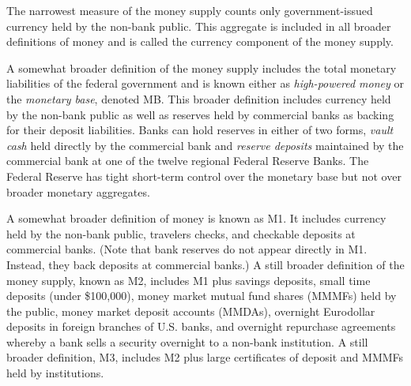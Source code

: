\documentclass[letterpaper,12pt]{article}
\begin{document}
The narrowest measure of the money supply counts only
government-issued currency held by the non-bank public. This
aggregate is included in all broader definitions of money and is
called the currency component of the money supply.

A somewhat broader definition of the money supply includes the total
monetary liabilities of the federal government and is known either
as \textit{high-powered money} or the \textit{monetary base},
denoted MB. This broader definition includes currency held by the
non-bank public as well as reserves held by commercial banks as
backing for their deposit liabilities. Banks can hold reserves in
either of two forms, \textit{vault cash} held directly by the
commercial bank and \textit{reserve deposits} maintained by the
commercial bank at one of the twelve regional Federal Reserve Banks.
The Federal Reserve has tight short-term control over the monetary
base but not over broader monetary aggregates.

A somewhat broader definition of money is known as M1. It includes
currency held by the non-bank public, travelers checks, and
checkable deposits at commercial banks. (Note that bank reserves do
not appear directly in M1. Instead, they back deposits at commercial
banks.) A still broader definition of the money supply, known as M2,
includes M1 plus savings deposits, small time deposits (under
\$100,000), money market mutual fund shares (MMMFs) held by the
public, money market deposit accounts (MMDAs), overnight Eurodollar
deposits in foreign branches of U.S. banks, and overnight repurchase
agreements whereby a bank sells a security overnight to a non-bank
institution. A still broader definition, M3, includes M2 plus large
certificates of deposit and MMMFs held by institutions.
\end{document}
